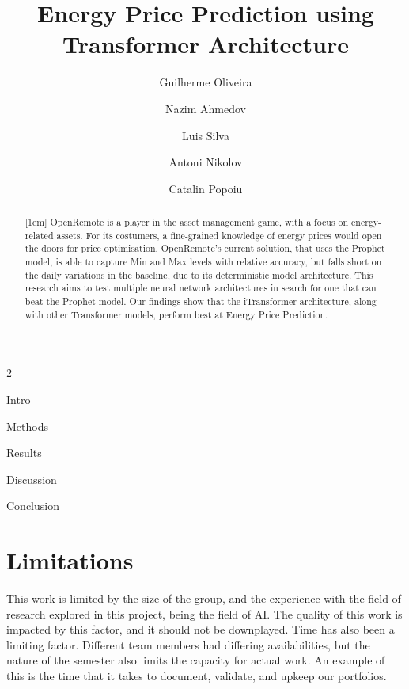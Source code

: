 \documentclass[print]{styledarticle}
\title{Energy Price Prediction using Transformer Architecture}
\author{Guilherme Oliveira \and Nazim Ahmedov \and Luis Silva \and Antoni Nikolov \and Catalin Popoiu} %
\date{}
\begin{document}
\maketitle

\begin{multicols*}{2}
    \begin{abstract}[1em]
        OpenRemote is a player in the asset management game, with a focus on energy-related assets. For its costumers, a fine-grained knowledge of energy prices would open the doors for price optimisation.
        OpenRemote's current solution, that uses the Prophet model, is able to capture Min and Max levels with relative accuracy, but falls short on the daily variations in the baseline, due to its deterministic model architecture.
        This research aims to test multiple neural network architectures in search for one that can beat the Prophet model.
        Our findings show that the iTransformer architecture, along with other Transformer models, perform best at Energy Price Prediction.
    \end{abstract}

    {Intro}

    {Methods}

    {Results}

    {Discussion}

    {Conclusion}

    \section{Limitations}
        This work is limited by the size of the group, and the experience with the field of research explored in this project, being the field of AI. The quality of this work is impacted by this factor, and it should not be downplayed.
        Time has also been a limiting factor. Different team members had differing availabilities, but the nature of the semester also limits the capacity for actual work. An example of this is the time that it takes to document, validate, and upkeep our portfolios.
\end{multicols*}



\end{document}
